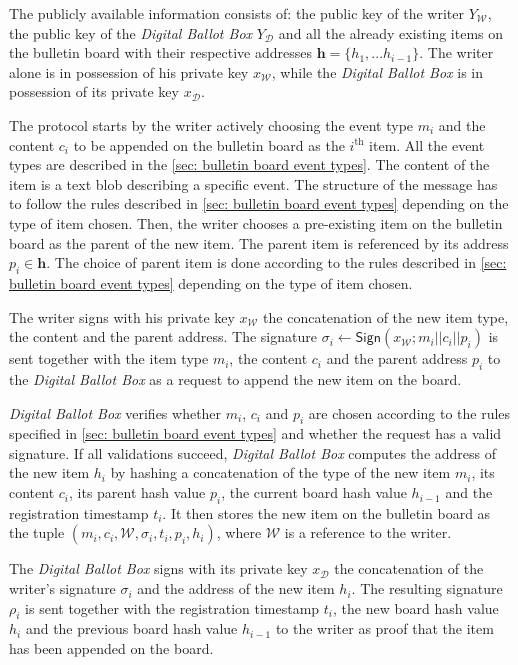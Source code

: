 The publicly available information consists of: the public key of the writer $Y_\mathcal{W}$, the public key of the \textit{Digital Ballot Box} $Y_\mathcal{D}$ and all the already existing items on the bulletin board with their respective addresses $\boldsymbol{h} = \{h_1, ... h_{i-1}\}$. The writer alone is in possession of his private key $x_\mathcal{W}$, while the \textit{Digital Ballot Box} is in possession of its private key $x_\mathcal{D}$.

The protocol starts by the writer actively choosing the event type $m_i$ and the content $c_i$ to be appended on the bulletin board as the $i^\mathrm{th}$ item. All the event types are described in the \cref{sec: bulletin board event types}. The content of the item is a text blob describing a specific event. The structure of the message has to follow the rules described in \cref{sec: bulletin board event types} depending on the type of item chosen. Then, the writer chooses a pre-existing item on the bulletin board as the parent of the new item. The parent item is referenced by its address $p_i \in \boldsymbol{h}$. The choice of parent item is done according to the rules described in \cref{sec: bulletin board event types} depending on the type of item chosen.

The writer signs with his private key $x_\mathcal{W}$ the concatenation of the new item type, the content and the parent address. The signature $\sigma_i \gets \mathsf{Sign}(x_\mathcal{W}; m_i || c_i || p_i)$ is sent together with the item type $m_i$, the content $c_i$ and the parent address $p_i$ to the \textit{Digital Ballot Box} as a request to append the new item on the board.

\textit{Digital Ballot Box} verifies whether $m_i$, $c_i$ and $p_i$ are chosen according to the rules specified in \cref{sec: bulletin board event types} and whether the request has a valid signature. If all validations succeed, \textit{Digital Ballot Box} computes the address of the new item $h_i$ by hashing a concatenation of the type of the new item $m_i$, its content $c_i$, its parent hash value $p_i$, the current board hash value $h_{i-1}$ and the registration timestamp $t_i$. It then stores the new item on the bulletin board as the tuple $(m_i, c_i, \mathcal{W}, \sigma_i, t_i, p_i, h_i)$, where $\mathcal{W}$ is a reference to the writer.

The \textit{Digital Ballot Box} signs with its private key $x_\mathcal{D}$ the concatenation of the writer's signature $\sigma_i$ and the address of the new item $h_i$. The resulting signature $\rho_i$ is sent together with the registration timestamp $t_i$, the new board hash value $h_i$ and the previous board hash value $h_{i-1}$ to the writer as proof that the item has been appended on the board.

